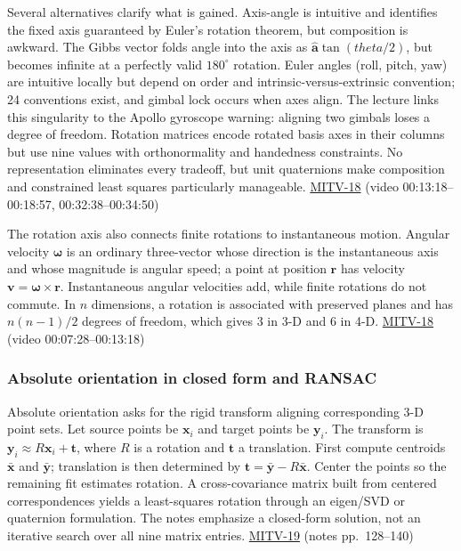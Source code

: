 Several alternatives clarify what is gained. Axis-angle is intuitive and identifies the fixed axis guaranteed by Euler's rotation theorem, but composition is awkward. The Gibbs vector folds angle into the axis as \(\hat{\mathbf{a}}\tan(theta/2)\), but becomes infinite at a perfectly valid \(180^\circ\) rotation. Euler angles (roll, pitch, yaw) are intuitive locally but depend on order and intrinsic-versus-extrinsic convention; 24 conventions exist, and gimbal lock occurs when axes align. The lecture links this singularity to the Apollo gyroscope warning: aligning two gimbals loses a degree of freedom. Rotation matrices encode rotated basis axes in their columns but use nine values with orthonormality and handedness constraints. No representation eliminates every tradeoff, but unit quaternions make composition and constrained least squares particularly manageable. \hyperref[04-visual-computing-ii-ch036]{MITV-18} (video 00:13:18--00:18:57, 00:32:38--00:34:50)

The rotation axis also connects finite rotations to instantaneous motion. Angular velocity \(\boldsymbol{\omega}\) is an ordinary three-vector whose direction is the instantaneous axis and whose magnitude is angular speed; a point at position \(\mathbf{r}\) has velocity \(\mathbf{v}=\boldsymbol{\omega}\times\mathbf{r}\). Instantaneous angular velocities add, while finite rotations do not commute. In \(n\) dimensions, a rotation is associated with preserved planes and has \(n(n-1)/2\) degrees of freedom, which gives 3 in 3-D and 6 in 4-D. \hyperref[04-visual-computing-ii-ch036]{MITV-18} (video 00:07:28--00:13:18)

\subsubsection{Absolute orientation in closed form and RANSAC}\label{absolute-orientation-in-closed-form-and-ransac}

Absolute orientation asks for the rigid transform aligning corresponding 3-D point sets. Let source points be \(\mathbf{x}_i\) and target points be \(\mathbf{y}_i\). The transform is \(\mathbf{y}_i\approx R\mathbf{x}_i+\mathbf{t}\), where \(R\) is a rotation and \(\mathbf{t}\) a translation. First compute centroids \(\bar{\mathbf{x}}\) and \(\bar{\mathbf{y}}\); translation is then determined by \(\mathbf{t}=\bar{\mathbf{y}}-R\bar{\mathbf{x}}\). Center the points so the remaining fit estimates rotation. A cross-covariance matrix built from centered correspondences yields a least-squares rotation through an eigen/SVD or quaternion formulation. The notes emphasize a closed-form solution, not an iterative search over all nine matrix entries. \hyperref[04-visual-computing-ii-ch036]{MITV-19} (notes pp.~128--140)

